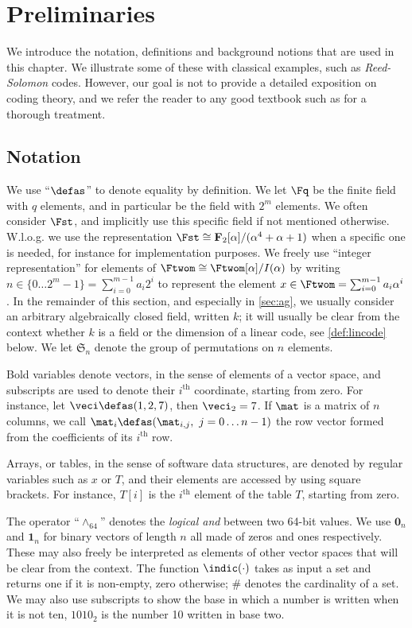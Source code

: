 \section{Preliminaries}
\label{not}

We introduce the notation, definitions and background notions that are used in this chapter. We illustrate some of these with classical examples, such as \emph{Reed-Solomon} codes. However,
our goal is not to provide a detailed exposition on coding theory, and we refer the reader to any good textbook such as \cite{vanlint} for a thorough treatment.

\subsection{Notation}
We use ``$\defas$'' to denote equality by definition.
We let $\Fq$
be the finite field with $q$ elements, and in particular
\Ftwom{} be the field with $2^m$ elements. We often consider $\Fst$, and implicitly use this specific field if not mentioned otherwise.
W.l.o.g. we use the representation
$\Fst \cong \mathbf{F}_2[\alpha]/(\alpha^4 + \alpha + 1)$ when a specific one is needed,
for instance for implementation purposes. We freely use ``integer representation'' for elements of $\Ftwom \cong \Ftwom[\alpha]/I(\alpha)$
by writing $n \in \{0\ldots2^m-1\} = \sum_{i = 0}^{m-1} a_i 2^i$ to represent the element
$x \in \Ftwom = \sum_{i = 0}^{m-1} a_i \alpha^i$. In the remainder of this section, and especially in \autoref{sec:ag}, we usually consider an arbitrary algebraically closed field, written $k$;
it will usually be clear from the context whether $k$ is a field or the dimension of a linear code, see \autoref{def:lincode} below.
We let $\mathfrak{S}_n$ denote the group of permutations on $n$ elements.

Bold variables denote vectors, in the sense of elements of a vector space, and subscripts are used to denote their $i^\text{th}$ coordinate, starting from zero. For instance,
let $\veci \defas (1, 2, 7)$, then  $\veci_2 = 7$.
If $\mat$ is a matrix of $n$ columns, we call $\mat_i \defas (\mat_{i,j},~j = 0\ldots n - 1)$ the row vector formed from the coefficients of
its $i^\text{th}$ row.

Arrays, or tables, in the sense of software data structures, are denoted by regular variables such as $x$ or $T$, and their elements are accessed by using square brackets.
For instance, $T[i]$ is the $i^\text{th}$ element of the table $T$, starting from zero.

The operator ``$\wedge_{64}$'' denotes the  \emph{logical and} between two 64-bit values. We use $\mathbf{0}_{n}$ and $\mathbf{1}_n$ for binary vectors of length $n$ all made of
zeros and ones respectively. These may also freely be interpreted as elements of other vector spaces that will be clear from the context.
The function $\indic(\cdot)$ takes as input a set and returns one if it is non-empty, zero otherwise; $\#$ denotes the cardinality of a set.
We may also use subscripts to show the base in which a number is written when it is not ten, \eg $1010_2$ is the number 10 written in base two.

